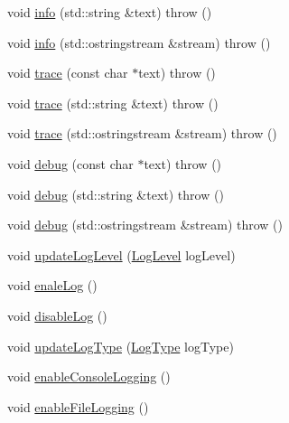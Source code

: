 \begin{DoxyCompactItemize}
\item 
void \mbox{\hyperlink{class_c_plus_plus_logging_1_1_logger_a6bb94d9cb668b1077b05ad7561537b77}{info}} (std\+::string \&text)  throw ()
\item 
void \mbox{\hyperlink{class_c_plus_plus_logging_1_1_logger_afeaa87416a0e17705d31cfd26c443e69}{info}} (std\+::ostringstream \&stream)  throw ()
\item 
void \mbox{\hyperlink{class_c_plus_plus_logging_1_1_logger_a21070ebcd5a7dc4a4bfc29851d4fd62f}{trace}} (const char $\ast$text)  throw ()
\item 
void \mbox{\hyperlink{class_c_plus_plus_logging_1_1_logger_a78318b153d51ed68922620da088dee13}{trace}} (std\+::string \&text)  throw ()
\item 
void \mbox{\hyperlink{class_c_plus_plus_logging_1_1_logger_a81f63ebe32dc8ec460944bea148c9e36}{trace}} (std\+::ostringstream \&stream)  throw ()
\item 
void \mbox{\hyperlink{class_c_plus_plus_logging_1_1_logger_aa008849ae4e444f020fdbdd63c5aa1ea}{debug}} (const char $\ast$text)  throw ()
\item 
void \mbox{\hyperlink{class_c_plus_plus_logging_1_1_logger_aa6093c7883b723b9a8c691a77c011f8b}{debug}} (std\+::string \&text)  throw ()
\item 
void \mbox{\hyperlink{class_c_plus_plus_logging_1_1_logger_a3c8037cfa27430b49c39c3505ada65b6}{debug}} (std\+::ostringstream \&stream)  throw ()
\item 
void \mbox{\hyperlink{class_c_plus_plus_logging_1_1_logger_ab40b9674237a65884f83fdc5687ecc34}{update\+Log\+Level}} (\mbox{\hyperlink{namespace_c_plus_plus_logging_af665d4fd4cbfd995a475e01ee59870ac}{Log\+Level}} log\+Level)
\item 
void \mbox{\hyperlink{class_c_plus_plus_logging_1_1_logger_a94da2e6eddddca73f0665bf45a99513c}{enale\+Log}} ()
\item 
void \mbox{\hyperlink{class_c_plus_plus_logging_1_1_logger_a374bdadbd47de0b39f973b6010077c99}{disable\+Log}} ()
\item 
void \mbox{\hyperlink{class_c_plus_plus_logging_1_1_logger_aeae9b06ce0f5445b2fa05303581b096d}{update\+Log\+Type}} (\mbox{\hyperlink{namespace_c_plus_plus_logging_a4dae38037c368f31976e9db62903ac0d}{Log\+Type}} log\+Type)
\item 
void \mbox{\hyperlink{class_c_plus_plus_logging_1_1_logger_a3433fe49292db3724cf8986d3ba5ff90}{enable\+Console\+Logging}} ()
\item 
void \mbox{\hyperlink{class_c_plus_plus_logging_1_1_logger_ac07cf1e825f53b1b1d9e41ea7eb4c179}{enable\+File\+Logging}} ()
\end{DoxyCompactItemize}
